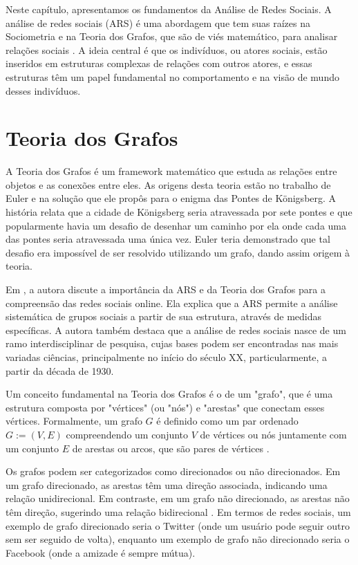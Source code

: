 Neste capítulo, apresentamos os fundamentos da Análise de Redes Sociais. A análise de redes sociais (ARS) é uma abordagem que tem suas raízes na Sociometria e na Teoria dos Grafos, que são de viés matemático, para analisar relações sociais \cite{2015_Recuero_BOOK}. A ideia central é que os indivíduos, ou atores sociais, estão inseridos em estruturas complexas de relações com outros atores, e essas estruturas têm um papel fundamental no comportamento e na visão de mundo desses indivíduos.

\section{Teoria dos Grafos}
A Teoria dos Grafos é um framework matemático que estuda as relações entre objetos e as conexões entre eles. As origens desta teoria estão no trabalho de Euler e na solução que ele propôs para o enigma das Pontes de Königsberg. A história relata que a cidade de Königsberg seria atravessada por sete pontes e que popularmente havia um desafio de desenhar um caminho por ela onde cada uma das pontes seria atravessada uma única vez. Euler teria demonstrado que tal desafio era impossível de ser resolvido utilizando um grafo, dando assim origem à teoria.

Em , a autora discute a importância da ARS e da Teoria dos Grafos para a compreensão das redes sociais online. Ela explica que a ARS permite a análise sistemática de grupos sociais a partir de sua estrutura, através de medidas específicas. A autora também destaca que a análise de redes sociais nasce de um ramo interdisciplinar de pesquisa, cujas bases podem ser encontradas nas mais variadas ciências, principalmente no início do século XX, particularmente, a partir da década de 1930.

Um conceito fundamental na Teoria dos Grafos é o de um "grafo", que é uma estrutura composta por "vértices" (ou "nós") e "arestas" que conectam esses vértices. Formalmente, um grafo $G$ é definido como um par ordenado $G := (V, E)$ compreendendo um conjunto $V$ de vértices ou nós juntamente com um conjunto $E$ de arestas ou arcos, que são pares de vértices \cite{1976_Bondy_BOOK}.

Os grafos podem ser categorizados como direcionados ou não direcionados. Em um grafo direcionado, as arestas têm uma direção associada, indicando uma relação unidirecional. Em contraste, em um grafo não direcionado, as arestas não têm direção, sugerindo uma relação bidirecional \cite{2000_West_BOOK}. Em termos de redes sociais, um exemplo de grafo direcionado seria o Twitter (onde um usuário pode seguir outro sem ser seguido de volta), enquanto um exemplo de grafo não direcionado seria o Facebook (onde a amizade é sempre mútua).

